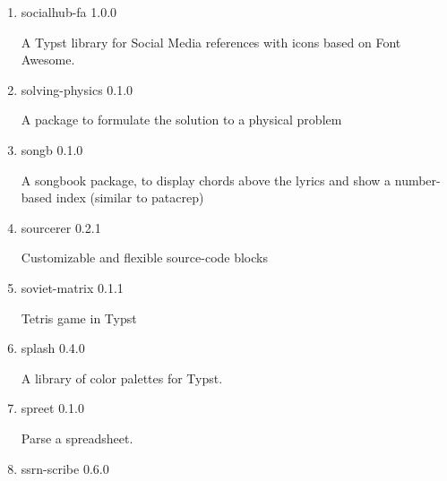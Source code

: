 \begin{enumerate}

  { smooth-tmlr } { 0.4.0 }

  Paper template for submission to Transaction on Machine Learning
  Research (TMLR)
\item
  \href{/universe/package/socialhub-fa/}{}

  { socialhub-fa } { 1.0.0 }

  A Typst library for Social Media references with icons based on Font
  Awesome.
\item
  \href{/universe/package/solving-physics/}{}

  { solving-physics } { 0.1.0 }

  A package to formulate the solution to a physical problem
\item
  \href{/universe/package/songb/}{}

  { songb } { 0.1.0 }

  A songbook package, to display chords above the lyrics and show a
  number-based index (similar to patacrep)
\item
  \href{/universe/package/sourcerer/}{}

  { sourcerer } { 0.2.1 }

  Customizable and flexible source-code blocks
\item
  \href{/universe/package/soviet-matrix/}{}


  { soviet-matrix } { 0.1.1 }

  Tetris game in Typst
\item
  \href{/universe/package/splash/}{}

  { splash } { 0.4.0 }

  A library of color palettes for Typst.
\item
  \href{/universe/package/spreet/}{}

  { spreet } { 0.1.0 }

  Parse a spreadsheet.
\item
  \href{/universe/package/ssrn-scribe/}{}


  { ssrn-scribe } { 0.6.0 }


\end{enumerate}

